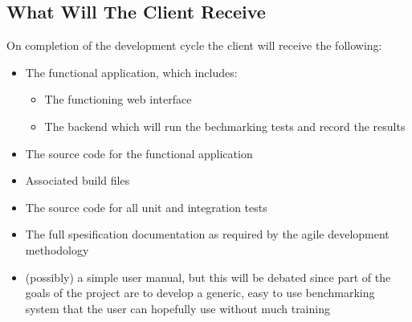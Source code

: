 \subsection{What Will The Client Receive}
On completion of the development cycle the client will receive the following:
\begin{itemize}
	\item The functional application, which includes:
	\begin{itemize}
		\item The functioning web interface
		\item The backend which will run the bechmarking tests and record the results
	\end{itemize}
	\item The source code for the functional application
	\item Associated build files
	\item The source code for all unit and integration tests
	\item The full spesification documentation as required by the agile development methodology
	\item (possibly) a simple user manual, but this will be debated since part of the goals of the project are to develop a generic, easy to use benchmarking system that the user can hopefully use without much training
\end{itemize}
